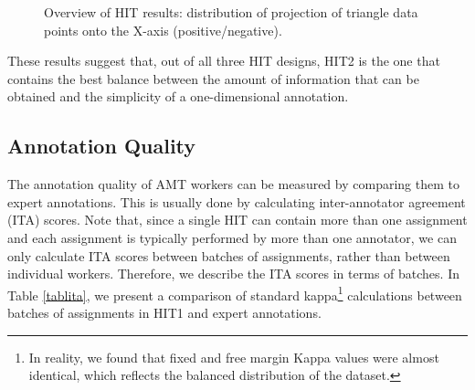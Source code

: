 \documentclass[11pt]{elsarticle}
\begin{document}
\begin{figure}
  \begin{center}
\caption{Overview of HIT results: distribution of projection of triangle data points onto the X-axis (positive/negative).}
\label{distr3b}
  \end{center}
\end{figure}




These results suggest that, out of all three HIT designs, HIT2 is the one that contains the best balance between the amount of information that can be obtained and the simplicity of a one-dimensional annotation.



\subsection{Annotation Quality}
\label{sect:quality}

The annotation quality of AMT workers can be measured by comparing them to expert annotations. This is usually done by calculating inter-annotator agreement (ITA) scores. Note that, since a single HIT can contain more than one assignment and each assignment is typically performed by more than one annotator, we can only calculate ITA scores between batches of assignments, rather than between individual workers. Therefore, we describe the ITA scores in terms of batches. In Table \ref{tablita}, we present a comparison of standard kappa\footnote{In reality, we found that fixed and free margin Kappa values were almost identical, which reflects the balanced distribution of the dataset.} calculations \cite{eugenio_kappa_2004} between batches of assignments in HIT1 and expert annotations.
\end{document}
